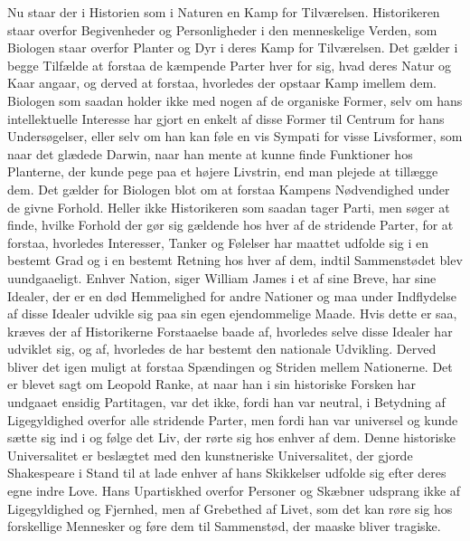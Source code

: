 \documentclass[12pt]{article}
\newcommand{\opage}[1]{\marginnote{\footnotesize\textit{[#1]}}}
\begin{document}
Nu staar der i Historien som i Naturen en Kamp for Tilværelsen.
Historikeren staar overfor Begivenheder og
\opage{80} %
Personligheder i den menneskelige Verden, som Biologen staar overfor
Planter og Dyr i deres Kamp for Tilværelsen. Det gælder i begge Tilfælde
at forstaa de kæmpende Parter hver for sig, hvad deres Natur og Kaar
angaar, og derved at forstaa, hvorledes der opstaar Kamp imellem dem.
Biologen som saadan \guillemotright holder ikke
med\guillemotleft{} nogen af de organiske Former, selv om hans
intellektuelle Interesse har gjort en enkelt af disse Former til Centrum
for hans Undersøgelser, eller selv om han kan føle en vis Sympati for
visse Livsformer, som naar det glædede Darwin, naar han mente at kunne
finde Funktioner hos Planterne, der kunde pege paa et højere Livstrin,
end man plejede at tillægge dem. Det gælder for Biologen blot om at
forstaa Kampens Nødvendighed under de givne Forhold. Heller ikke
Historikeren som saadan tager Parti, men søger at finde, hvilke Forhold
der gør sig gældende hos hver af de stridende Parter, for at forstaa,
hvorledes Interesser, Tanker og Følelser har maattet udfolde sig i en
bestemt Grad og i en bestemt Retning hos hver af dem, indtil
Sammenstødet blev uundgaaeligt. Enhver Nation, siger William James i et
af sine Breve, har sine Idealer, der er en død Hemmelighed for andre
Nationer og maa under Indflydelse af disse Idealer udvikle sig paa sin
egen ejendommelige Maade. Hvis dette er saa, kræves der af Historikerne
Forstaaelse baade af, hvorledes selve disse Idealer har udviklet sig, og
af, hvorledes de har bestemt den nationale Udvikling. Derved bliver det
igen muligt at forstaa Spændingen og Striden mellem Nationerne. Det er
blevet sagt om Leopold Ranke, at naar han i sin historiske Forsken har
undgaaet ensidig Partitagen, var det ikke, fordi han var neutral, i
Betydning af Ligegyldighed overfor alle stridende Parter, men fordi han
var universel og kunde sætte sig ind i og følge
\opage{81} det Liv, der rørte sig hos enhver af dem. Denne historiske Universalitet
er beslægtet med den kunstneriske Universalitet, der gjorde Shakespeare
i Stand til at lade enhver af hans Skikkelser udfolde sig efter deres
egne indre Love. Hans Upartiskhed overfor Personer og Skæbner udsprang
ikke af Ligegyldighed og Fjernhed, men af Grebethed af Livet, som det
kan røre sig hos forskellige Mennesker og føre dem til Sammenstød, der
maaske bliver tragiske.
\end{document}
